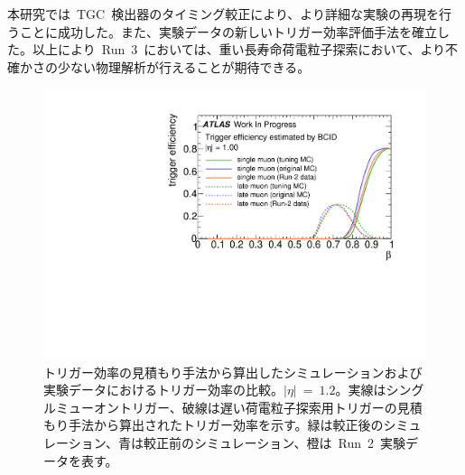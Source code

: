本研究では~TGC~検出器のタイミング較正により、より詳細な実験の再現を行うことに成功した。また、実験データの新しいトリガー効率評価手法を確立した。以上により~Run~3~においては、重い長寿命荷電粒子探索において、より不確かさの少ない物理解析が行えることが期待できる。
\begin{figure}[H]
    \centering   
    \includegraphics[width=\textwidth,page=4]{img/rec/est_eff.pdf}
    \caption[トリガー効率の見積もり手法から算出したシミュレーションおよび実験データにおけるトリガー効率の比較]{トリガー効率の見積もり手法から算出したシミュレーションおよび実験データにおけるトリガー効率の比較。$|\eta|~=~1.2$。実線はシングルミューオントリガー、破線は遅い荷電粒子探索用トリガーの見積もり手法から算出されたトリガー効率を示す。緑は較正後のシミュレーション、青は較正前のシミュレーション、橙は~Run~2~実験データを表す。}\label{fig:rectri}
\end{figure}

